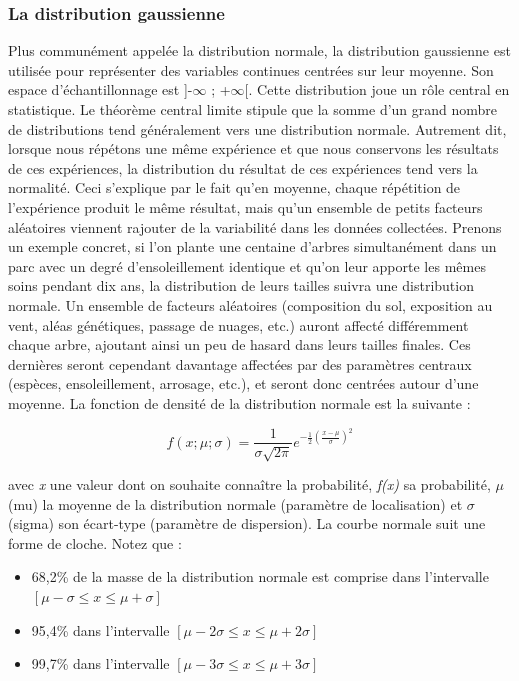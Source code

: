 \documentclass[
  11pt,
  french,
]{book}
\providecommand{\tightlist}{%
  \setlength{\itemsep}{0pt}\setlength{\parskip}{0pt}}
\begin{document}
\hypertarget{la-distribution-gaussienne}{%
\subsubsection{La distribution gaussienne}\label{la-distribution-gaussienne}}

Plus communément appelée la distribution normale, la distribution gaussienne est utilisée pour représenter des variables continues centrées sur leur moyenne. Son espace d'échantillonnage est {]}-\(\infty\) ; +\(\infty\){[}. Cette distribution joue un rôle central en statistique. Le théorème central limite stipule que la somme d'un grand nombre de distributions tend généralement vers une distribution normale. Autrement dit, lorsque nous répétons une même expérience et que nous conservons les résultats de ces expériences, la distribution du résultat de ces expériences tend vers la normalité. Ceci s'explique par le fait qu'en moyenne, chaque répétition de l'expérience produit le même résultat, mais qu'un ensemble de petits facteurs aléatoires viennent rajouter de la variabilité dans les données collectées. Prenons un exemple concret, si l'on plante une centaine d'arbres simultanément dans un parc avec un degré d'ensoleillement identique et qu'on leur apporte les mêmes soins pendant dix ans, la distribution de leurs tailles suivra une distribution normale. Un ensemble de facteurs aléatoires (composition du sol, exposition au vent, aléas génétiques, passage de nuages, etc.) auront affecté différemment chaque arbre, ajoutant ainsi un peu de hasard dans leurs tailles finales. Ces dernières seront cependant davantage affectées par des paramètres centraux (espèces, ensoleillement, arrosage, etc.), et seront donc centrées autour d'une moyenne.
La fonction de densité de la distribution normale est la suivante :

\footnotesize

\begin{equation} f(x ; \mu ; \sigma)=\frac{1}{\sigma \sqrt{2 \pi}} e^{-\frac{1}{2}\left(\frac{x-\mu}{\sigma}\right)^{2}}
\label{eq:gaussien}
\end{equation}
\normalsize

avec \emph{x} une valeur dont on souhaite connaître la probabilité, \emph{f(x)} sa probabilité, \(\mu\) (mu) la moyenne de la distribution normale (paramètre de localisation) et \(\sigma\) (sigma) son écart-type (paramètre de dispersion). La courbe normale suit une forme de cloche. Notez que :

\begin{itemize}
\tightlist
\item
  68,2\% de la masse de la distribution normale est comprise dans l'intervalle \([\mu- \sigma≤x≤ \mu+ \sigma]\)
\item
  95,4\% dans l'intervalle \([\mu- 2\sigma≤x≤ \mu+ 2\sigma]\)
\item
  99,7\% dans l'intervalle \([\mu- 3\sigma≤x≤ \mu+ 3\sigma]\)
\end{itemize}
\end{document}
